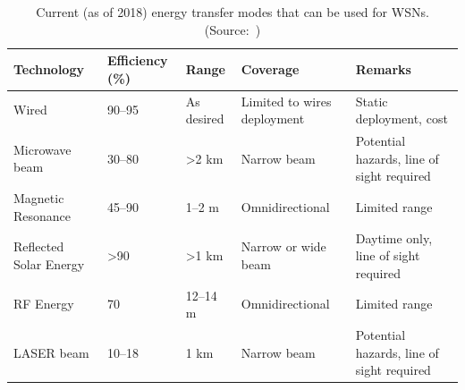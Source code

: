 \documentclass[12pt, oneandhalf, chaparabic, sees, ms]{metu}
\begin{document}
\renewcommand{\arraystretch}{2}%
\begin{table}[H]
\begin{center}
\caption{Current (as of 2018) energy transfer modes that can be used for WSNs. (Source:~\protect\cite{khan2015})}
\label{tab:etrans}
\begin{adjustbox}{max width=\textwidth}
\begin{tabular}{| l || l | l | l | l |} 
\hline
\rowcolor{lightgray}
\textbf{Technology} & \textbf{Efficiency (\%)} & \textbf{Range} & \textbf{Coverage} & \textbf{Remarks}\tabularnewline
\hline \hline
\cellcolor{lightgray} Wired                  & 90–95 & As desired & Limited to wires deployment & Static deployment, cost                     \tabularnewline \hline
\cellcolor{lightgray} Microwave beam         & 30–80 & >2 km      & Narrow beam                 & Potential hazards, line of sight required   \tabularnewline \hline
\cellcolor{lightgray} Magnetic Resonance     & 45–90 & 1–2 m      & Omnidirectional            & Limited range                               \tabularnewline \hline
\cellcolor{lightgray} Reflected Solar Energy & >90   & >1 km      & Narrow or wide beam         & Daytime only, line of sight required        \tabularnewline \hline
\cellcolor{lightgray} RF Energy              & 70    & 12–14 m    & Omnidirectional            & Limited range                               \tabularnewline \hline
\cellcolor{lightgray} LASER beam             & 10–18 & 1 km       & Narrow beam                 & Potential hazards, line of sight required   \tabularnewline \hline
\end{tabular}
\end{adjustbox}
\end{center}
\end{table}
\renewcommand{\arraystretch}{1}%
% 
\end{document}
